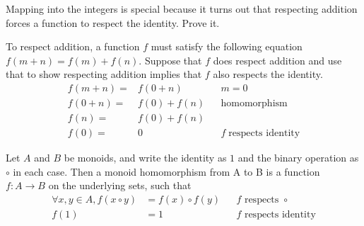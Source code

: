 \begin{ttta}
	Mapping into the integers is special because it turns out that respecting
	addition forces a function to respect the identity. Prove it.
\end{ttta}
\begin{figure}[H]
	\begin{center}
		
	\end{center}
\end{figure}
\begin{proofitem}
	\item To respect addition, a function $f$ must satisfy the following equation $f(m+n) =
		f(m)+f(n)$.  Suppose that $f$ does respect addition and use that to show respecting addition
	implies that $f$ also respects the identity.
	\begin{align*}
		f(m+n) = & f(0 +n)     &  & m=0                         \\
		f(0+n) = & f(0) + f(n) &  & \text{homomorphism}         \\
		f(n) =   & f(0) + f(n)                                  \\
		f(0) =   & 0           &  & f\;\text{respects identity}
	\end{align*}
\end{proofitem}

\begin{figure}[H]
	\begin{center}
		
	\end{center}
\end{figure}
\begin{definition}
	Let $A$ and $B$ be monoids, and write the identity as $1$ and the
	binary operation as $\circ$ in each case. Then a monoid homomorphism from A to
	B is a function $f:A\rightarrow B$ on the underlying sets, such that
	\begin{align*}
		\forall x, y \in A, f(x \circ y) & = f(x) \circ f(y) &  & f\text{ respects }\circ    \\
		f(1)                             & =1                &  & f\text{ respects identity}
	\end{align*}
\end{definition}

